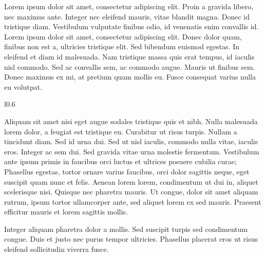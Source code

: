 \documentclass{hochgiblogpost}
\begin{document}
    \begin{flushleft}
        Lorem ipsum dolor sit amet, consectetur adipiscing elit. Proin a gravida libero, nec maximus ante. Integer nec eleifend mauris, vitae blandit magna. Donec id tristique diam. Vestibulum vulputate finibus odio, id venenatis enim convallis id. Lorem ipsum dolor sit amet, consectetur adipiscing elit. Donec dolor quam, finibus non est a, ultricies tristique elit. Sed bibendum euismod egestas. In eleifend et diam id malesuada. Nam tristique massa quis erat tempus, id iaculis nisl commodo. Sed ac convallis sem, ac commodo augue. Mauris ut finibus sem. Donec maximus ex mi, at pretium quam mollis eu. Fusce consequat varius nulla eu volutpat. 
    \end{flushleft}

    \begin{wrapfigure}[12]{l}{0.6\textwidth}
        
    \end{wrapfigure}
    Aliquam sit amet nisi eget augue sodales tristique quis et nibh. Nulla malesuada lorem dolor, a feugiat est tristique eu. Curabitur ut risus turpis. Nullam a tincidunt diam. Sed id urna dui. Sed ut nisl iaculis, commodo nulla vitae, iaculis eros. Integer ac sem dui. Sed gravida vitae urna molestie fermentum. Vestibulum ante ipsum primis in faucibus orci luctus et ultrices posuere cubilia curae; Phasellus egestas, tortor ornare varius faucibus, orci dolor sagittis neque, eget suscipit quam nunc et felis. Aenean lorem lorem, condimentum ut dui in, aliquet scelerisque nisi. Quisque nec pharetra mauris. Ut congue, dolor sit amet aliquam rutrum, ipsum tortor ullamcorper ante, sed aliquet lorem ex sed mauris. Praesent efficitur mauris et lorem sagittis mollis.

    Integer aliquam pharetra dolor a mollis. Sed suscipit turpis sed condimentum congue. Duis et justo nec purus tempor ultricies. Phasellus placerat eros ut risus eleifend sollicitudin viverra fusce. 
\end{document}

